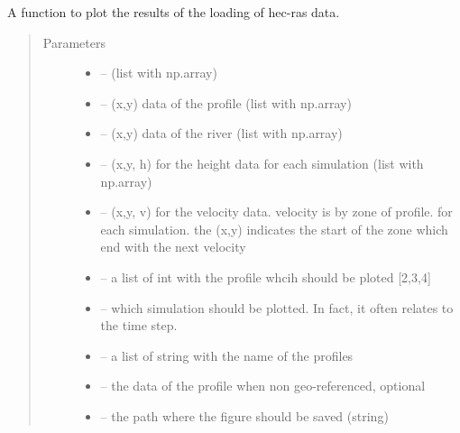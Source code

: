 \documentclass[letterpaper,10pt,english]{sphinxmanual}
\begin{document}
\begin{fulllineitems}
\label{\detokenize{index:src.Hec_ras06.figure_xml}}
A function to plot the results of the loading of hec-ras data.
\begin{quote}\begin{description}
\item[{Parameters}] \leavevmode\begin{itemize}
\item {} 
 -- (list with np.array)

\item {} 
 -- (x,y) data of the profile (list with np.array)

\item {} 
 -- (x,y) data of the river (list with np.array)

\item {} 
 -- (x,y, h) for the height data for each simulation (list with np.array)

\item {} 
 -- (x,y, v) for the velocity data. velocity is by zone of profile. for each simulation.
the (x,y) indicates the start of the zone which end with the next velocity

\item {} 
 -- a list of int with the profile whcih should be ploted {[}2,3,4{]}

\item {} 
 -- which simulation should be plotted. In fact, it often relates to the time step.

\item {} 
 -- a list of string with the name of the profiles

\item {} 
 -- the data of the profile when non geo-referenced, optional

\item {} 
 -- the path where the figure should be saved (string)


\end{itemize}
\end{description}
\end{quote}
\end{fulllineitems}
\end{document}
